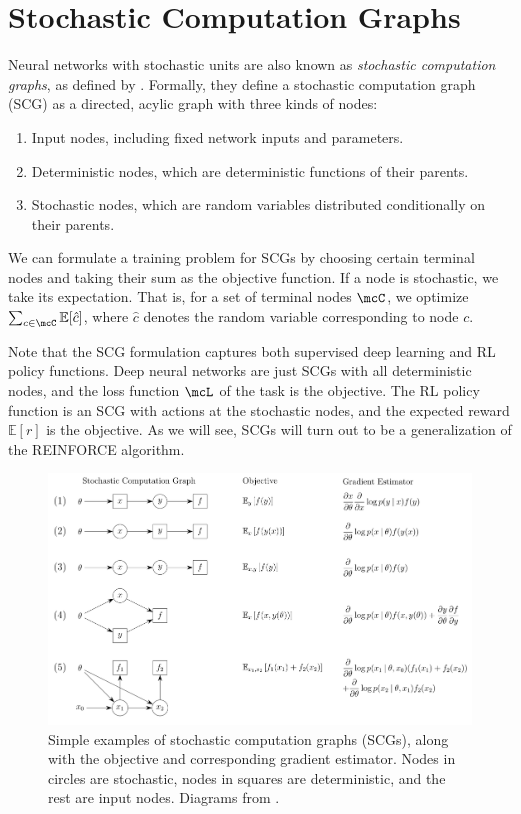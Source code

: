 \documentclass[12pt]{report}
\begin{document}
\section{Stochastic Computation Graphs}

Neural networks with stochastic units are also known as \emph{stochastic computation graphs}, as defined by \citet{schulman2015backprop}. Formally, they define a stochastic computation graph (SCG) as a directed, acylic graph with three kinds of nodes:
\begin{enumerate}
\item Input nodes, including fixed network inputs and parameters.
\item Deterministic nodes, which are deterministic functions of their parents.
\item Stochastic nodes, which are random variables distributed conditionally on their parents.
\end{enumerate}
We can formulate a training problem for SCGs by choosing certain terminal nodes and taking their sum as the objective function. If a node is stochastic, we take its expectation. That is, for a set of terminal nodes $\mcC$, we optimize $\sum_{c \in \mcC} \mathbb{E}[\hat{c}]$, where $\hat{c}$ denotes the random variable corresponding to node $c$.

Note that the SCG formulation captures both supervised deep learning and RL policy functions. Deep neural networks are just SCGs with all deterministic nodes, and the loss function $\mcL$ of the task is the objective. The RL policy function is an SCG with actions at the stochastic nodes, and the expected reward $\mathbb{E}[r]$ is the objective. As we will see, SCGs will turn out to be a generalization of the REINFORCE algorithm.

\begin{figure}[t]
\includegraphics[width=\textwidth]{images/SCGs}
\caption{Simple examples of stochastic computation graphs (SCGs), along with the objective and corresponding gradient estimator. Nodes in circles are stochastic, nodes in squares are deterministic, and the rest are input nodes. Diagrams from \citet{schulman2015backprop}.}
\label{fig:scg}
\end{figure}
\end{document}
